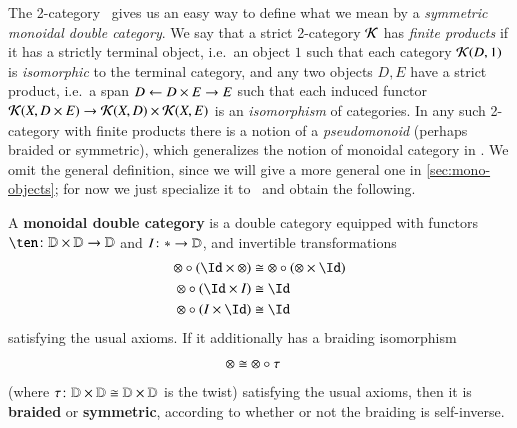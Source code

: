 The 2-category \cDbl\ gives us an easy way to define what we mean by a
\emph{symmetric monoidal double category}.
We say that a strict 2-category $\mathcal{K}$ has \emph{finite products} if it has a strictly terminal object, i.e.\ an object $1$ such that each category $\mathcal{K}(D,1)$ is \emph{isomorphic} to the terminal category, and any two objects $D,E$ have a strict product, i.e.\ a span $D \leftarrow D\times E \to E$ such that each induced functor $\mathcal{K}(X,D\times E) \to \mathcal{K}(X,D) \times \mathcal{K}(X,E)$ is an \emph{isomorphism} of categories.
In any such 2-category with finite products there is a notion of a \emph{pseudomonoid} (perhaps braided or symmetric), which generalizes the notion of monoidal category in \cCat.
We omit the general definition, since we will give a more general one in \cref{sec:mono-objects};
for now we just specialize it to \cDbl\ and obtain the following.

\begin{defn}\label{def:symmondoub}
  A \textbf{monoidal double category} is a double category equipped
  with functors $\ten\maps \lD\times\lD\to\lD$ and $I\colon * \to\mathbb{D}$,
  and invertible transformations
  \begin{align*}
    \mathord{\otimes} \circ (\Id\times \mathord{\otimes})
    &\iso \mathord{\otimes} \circ (\mathord{\otimes} \times \Id)\\
    \mathord{\otimes} \circ (\Id\times I) &\iso \Id\\
    \mathord{\otimes} \circ (I\times \Id) &\iso \Id
  \end{align*}
  satisfying the usual axioms.  If it additionally has a braiding
  isomorphism
  \begin{align*}
    \mathord{\otimes} &\cong \mathord{\otimes} \circ \tau
  \end{align*}
  (where $\tau\colon \mathbb{D}\times\mathbb{D}\cong \mathbb{D}\times\mathbb{D}$ is the twist)
  satisfying the usual axioms, then it is \textbf{braided} or
  \textbf{symmetric}, according to whether or not the braiding is
  self-inverse.
\end{defn}

